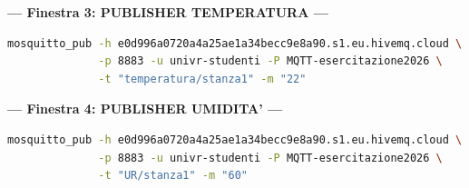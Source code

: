 \documentclass[11pt]{article}
\begin{document}
\begin{tcolorbox}[colback=green!5!white,colframe=green!75!black,title=\textbf{RISPOSTA}, breakable]
\textbf{--- Finestra 3: PUBLISHER TEMPERATURA ---}
\begin{lstlisting}[language=bash, basicstyle=\ttfamily\small]
mosquitto_pub -h e0d996a0720a4a25ae1a34becc9e8a90.s1.eu.hivemq.cloud \
              -p 8883 -u univr-studenti -P MQTT-esercitazione2026 \
              -t "temperatura/stanza1" -m "22"
\end{lstlisting}

\textbf{--- Finestra 4: PUBLISHER UMIDITA' ---}
\begin{lstlisting}[language=bash, basicstyle=\ttfamily\small]
mosquitto_pub -h e0d996a0720a4a25ae1a34becc9e8a90.s1.eu.hivemq.cloud \
              -p 8883 -u univr-studenti -P MQTT-esercitazione2026 \
              -t "UR/stanza1" -m "60"
\end{lstlisting}
\end{tcolorbox}
\end{document}
